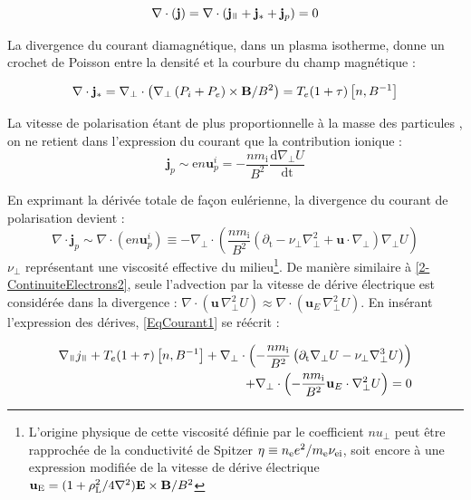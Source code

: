 \begin{refsection}
\begin{equation}
\label{EqCourant1}
\nabla\cdot\left(\mathbf{j}\right) = 
\nabla\cdot\left(\mathbf{j}_\para+\mathbf{j}_*+\mathbf{j}_p\right)
= 0
\end{equation}

La divergence du courant diamagnétique, dans un plasma isotherme, donne un
crochet de Poisson entre la densité et la courbure du champ magnétique :

\begin{equation}
\nabla\cdot\mathbf{j}_*=
\nabla_\perp\cdot\left(\nabla_\perp\left(
P_i+P_e\right)\times\mathbf{B}/B^2\right) =
T_e(1+\tau)\left[n,B^{{-1}}\right]
\end{equation}

La vitesse de polarisation étant de plus
proportionnelle à la masse des particules , on ne
retient dans l'expression du courant que la contribution ionique :
\begin{equation}
\mathbf{j}_p\sim\text{e}n\mathbf{u}^i_p=-\frac{nm_\text{i}}{B^2}\frac{\text{d}\nabla_\perp
U}{\text{dt}}
\end{equation}

En exprimant la dérivée totale de
façon eulérienne, la divergence du courant de polarisation devient :
\begin{equation}
\nabla\cdot\mathbf{j}_p\sim\nabla\cdot\left(\text{e}n\mathbf{u}^i_p\right)\equiv
-\nabla_\perp\cdot\left(\frac{nm_\text{i}}{B^2}\left(\partial_\text{t} -
\nu_\perp \nabla_\perp^2 +
\mathbf{u}\cdot\nabla_\perp\right)\nabla_\perp U\right)
\end{equation}
$\nu_\perp$ représentant une viscosité effective du milieu\footnote{L'origine
physique de cette viscosité définie par le coefficient $nu_\perp$ peut être
rapprochée de la conductivité de Spitzer $\eta\equiv
n_\text{e}e^{{2}}/m_\text{e}\nu_\text{ei}$, soit encore à une expression
modifiée de la vitesse de dérive électrique
$\mathbf{u}_\text{E}=(1+\rho_\text{L}^{{2}}/4\nabla^{{2}})\mathbf{E}\times\mathbf{B}/B^{{2}}$}.
De manière similaire à \eqref{2-ContinuiteElectrons2}, seule l'advection par la
vitesse de dérive électrique est considérée dans la divergence : 
$\nabla\cdot\left(\mathbf{u}\,\nabla_\perp^2 U\right)
\approx\nabla\cdot\left(\mathbf{u}_E\,\nabla_\perp^2 U\right)$.
En insérant l'expression des dérives, \eqref{EqCourant1} se réécrit :

\begin{equation}\begin{split}
\label{EqCourant2}
\nabla_\para j_\para +
T_e(1+\tau)\left[n,B\puissance{-1}\right] + \nabla_\perp\cdot\left(-\frac{nm_\text{i}}{B^2}\left(\partial_\text{t}\nabla_\perp
U - \nu_\perp \nabla_\perp^3 U \right)\right) \\+
\nabla_\perp\cdot\left(-\frac{nm_\text{i}}{B^2}\mathbf{u}_E\cdot\nabla_\perp^2
U\right)=0
\end{split}
\end{equation}


\end{refsection}
